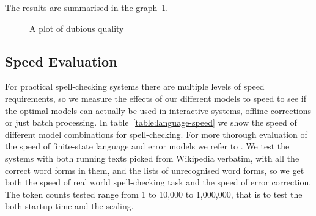 \documentclass[a4paper,12pt]{article}
\begin{document}
The results are summarised in the graph~\ref{fig:quality}.

\begin{figure}
    \centering
    \caption{A plot of dubious quality
    \label{fig:quality}}
\end{figure}


\subsection{Speed Evaluation}

For practical spell-checking systems there are multiple levels of speed
requirements, so we measure the effects of our different models to speed to see
if the optimal models can actually be used in interactive systems, offline
corrections or just batch processing. In table~\ref{table:language-speed} we
show the speed of different model combinations for spell-checking. For more
thorough evaluation of the speed of finite-state language and error models we
refer to \cite{pirinen2012improving}. We test the systems with both running
texts picked from Wikipedia verbatim, with all the correct word forms in them,
and the lists of unrecognised word forms, so we get both the speed of real
world spell-checking task and the speed of error correction. The token counts
tested range from 1 to 10,000 to 1,000,000, that is to test the both startup
time and the scaling.
\end{document}
